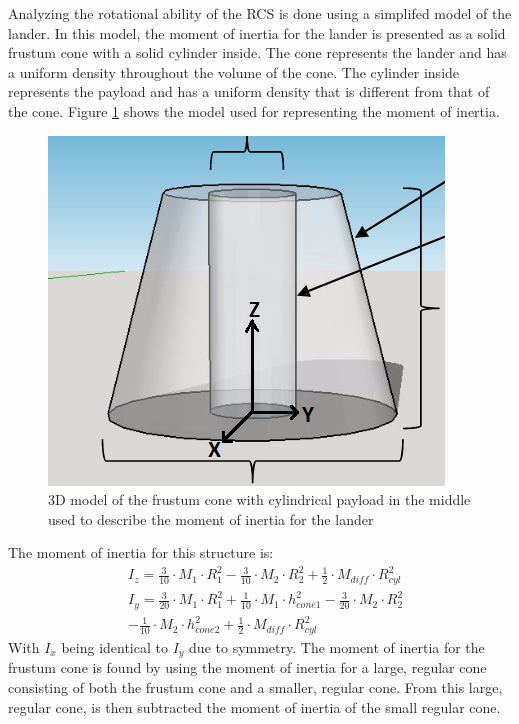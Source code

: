 Analyzing the rotational ability of the RCS is done using a simplifed model of the lander. In this model, the moment of inertia for the lander is presented as a solid frustum cone with a solid cylinder inside. The cone represents the lander and has a uniform density throughout the volume of the cone. The cylinder inside represents the payload and has a uniform density that is different from that of the cone. Figure \ref{fig:cone} shows the model used for representing the moment of inertia.

\begin{figure}[htb]
\begin{center}
\includegraphics[scale=1]{figures/RCS/cone_payload}
\caption{3D model of the frustum cone with cylindrical payload in the middle used to describe the moment of inertia for the lander}
\label{fig:cone}
\end{center}
\end{figure}

\noindent
The moment of inertia for this structure is:
\begin{equation}
\begin{split}
   & I_{z} = \frac{3}{10} \cdot M_{1} \cdot R_{1}^2 - \frac{3}{10} \cdot M_{2} \cdot R_{2}^2 + \frac{1}{2} \cdot M_{diff} \cdot R_{cyl}^2\\
   & I_{y} = \frac{3}{20} \cdot M_{1} \cdot R_{1}^2 + \frac{1}{10} \cdot M_{1} \cdot h_{cone1}^2 - \frac{3}{20} \cdot M_{2} \cdot R_{2}^2\\
   &     - \frac{1}{10} \cdot M_{2} \cdot h_{cone2}^2 + \frac{1}{2} \cdot M_{diff} \cdot R_{cyl}^2
\end{split}
\end{equation}
With $I_x$ being identical to $I_y$ due to symmetry. The moment of inertia for the frustum cone is found by using the moment of inertia for a large, regular cone consisting of both the frustum cone and a smaller, regular cone. From this large, regular cone, is then subtracted the moment of inertia of the small regular cone. 

